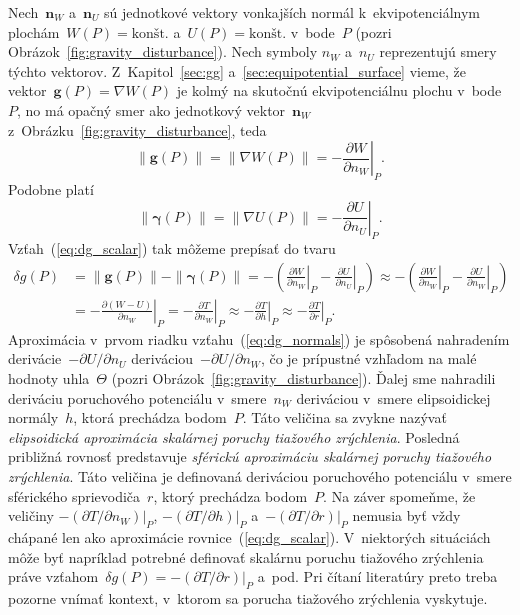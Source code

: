 \documentclass[a4paper, 12pt]{book}
\let\vec\mathbf
\begin{document}
Nech~$\vec n_W$ a~$\vec n_U$ sú jednotkové vektory vonkajších normál 
k~ekvipotenciálnym plochám~$W(P) = \textrm{konšt.}$ a~$U(P) = \textrm{konšt.}$ 
v~bode~$P$ (pozri Obrázok~\ref{fig:gravity_disturbance}).  Nech symboly $n_W$ 
a~$n_U$ reprezentujú smery týchto vektorov.  Z~Kapitol~\ref{sec:gg} 
a~\ref{sec:equipotential_surface} vieme, že vektor~$\vec g(P) = \nabla W(P)$ je 
kolmý na skutočnú ekvipotenciálnu plochu v~bode~$P$, no má opačný smer ako 
jednotkový vektor~$\vec n_W$ z~Obrázku~\ref{fig:gravity_disturbance}, teda
%
\begin{equation}
\| \vec g(P) \| = \| \nabla W(P) \| = -\left.\frac{\partial W}{\partial 
n_W}\right|_P.
\end{equation}
%
Podobne platí
%
\begin{equation}
\| \boldsymbol \gamma(P) \| = \| \nabla U(P) \| = -\left.\frac{\partial 
U}{\partial n_U}\right|_P.
\end{equation}
%
Vzťah~(\ref{eq:dg_scalar}) tak môžeme prepísať do tvaru
%
\begin{equation}
\label{eq:dg_normals}
\begin{split}
\delta g(P) &= \| \vec g(P) \| - \| \boldsymbol\gamma(P) \| = -\left( 
\left.\frac{\partial W}{\partial n_W}\right|_P - \left.\frac{\partial 
U}{\partial n_U}\right|_P\right) \approx -\left( \left.\frac{\partial 
W}{\partial n_W}\right|_P - \left.\frac{\partial U}{\partial 
n_W}\right|_P\right)\\
%
&= -\left.\frac{\partial (W - U)}{\partial n_W}\right|_P 
=  -\left.\frac{\partial T}{\partial n_W}\right|_P \approx 
-\left.\frac{\partial T}{\partial h}\right|_P \approx -\left.\frac{\partial 
T}{\partial r}\right|_P{.}
\end{split}
\end{equation}
%
Aproximácia v~prvom riadku vzťahu~(\ref{eq:dg_normals}) je spôsobená nahradením 
derivácie~$-\partial U \slash \partial n_U$ deriváciou~$-\partial U \slash 
\partial n_W$, čo je prípustné vzhľadom na malé hodnoty uhla~$\Theta$ (pozri 
Obrázok~\ref{fig:gravity_disturbance}).  Ďalej sme nahradili deriváciu 
poruchového potenciálu v~smere~$n_W$ deriváciou v~smere elipsoidickej 
normály~$h$, ktorá prechádza bodom~$P$.  Táto veličina sa zvykne nazývať 
\emph{elipsoidická aproximácia skalárnej poruchy tiažového zrýchlenia}.  
Posledná približná rovnosť predstavuje \emph{sférickú aproximáciu skalárnej 
poruchy tiažového zrýchlenia}.  Táto veličina je definovaná deriváciou 
poruchového potenciálu v~smere sférického sprievodiča~$r$, ktorý prechádza 
bodom~$P$.  Na záver spomeňme, že veličiny $-\left(\partial T \slash \partial 
n_W\right)|_P$, $-\left(\partial T \slash \partial h\right)|_P$ 
a~$-\left(\partial T \slash \partial r\right)|_P$ nemusia byť vždy chápané len 
ako aproximácie rovnice~(\ref{eq:dg_scalar}).  V~niektorých situáciách môže byť 
napríklad potrebné definovať skalárnu poruchu tiažového zrýchlenia práve 
vzťahom~$\delta g(P) = -\left(\partial T \slash \partial r \right)|_P$ a~pod.  
Pri čítaní literatúry preto treba pozorne vnímať kontext, v~ktorom sa porucha 
tiažového zrýchlenia vyskytuje.
\end{document}
